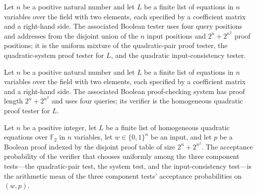 \begin{definition}
\label{FABL.homogeneousQuadraticProofFunctionTester}
\leanok
{}
Let $n$ be a positive natural number and let $L$ be a finite list of equations in $n$
variables over the field with two elements, each specified by a coefficient matrix and a
right-hand side. The associated Boolean tester uses four query positions and addresses
from the disjoint union of the $n$ input positions and $2^n+2^{n^2}$ proof positions; it
is the uniform mixture of the quadratic-pair proof tester, the quadratic-system proof
tester for $L$, and the quadratic input-consistency tester.
\end{definition}

\begin{definition}
\label{FABL.homogeneousQuadraticPCPPSystem}
\leanok
{}
Let $n$ be a positive natural number and let $L$ be a finite list of equations in $n$
variables over the field with two elements, each specified by a coefficient matrix and a
right-hand side. The associated Boolean proof-checking system has proof length
$2^n+2^{n^2}$ and uses four queries; its verifier is the homogeneous quadratic proof
tester for $L$.
\end{definition}

\begin{theorem}
\label{FABL.homogeneousQuadraticPCPPSystem_acceptanceProbability}
\leanok
{}
Let $n$ be a positive integer, let $L$ be a finite list of homogeneous quadratic
equations over $\mathbb F_2$ in $n$ variables, let $w\in\{0,1\}^n$ be an input, and let
$p$ be a Boolean proof indexed by the disjoint proof table of size $2^n+2^{n^2}$. The
acceptance probability of the verifier that chooses uniformly among the three component
tests—the quadratic-pair test, the system test, and the input-consistency test—is the
arithmetic mean of the three component tests’ acceptance probabilities on $(w,p)$.
\end{theorem}

